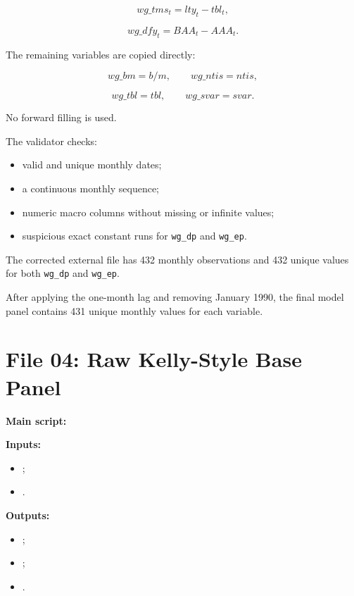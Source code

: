 \documentclass[11pt,a4paper]{article}
\newcommand{\code}[1]{\texttt{#1}}
\begin{document}
\[
  wg\_tms_t
  =
  lty_t-tbl_t,
\]

\[
  wg\_dfy_t
  =
  BAA_t-AAA_t.
\]

The remaining variables are copied directly:

\[
  wg\_bm=b/m,
  \qquad
  wg\_ntis=ntis,
\]

\[
  wg\_tbl=tbl,
  \qquad
  wg\_svar=svar.
\]

No forward filling is used.

The validator checks:

\begin{itemize}
  \item valid and unique monthly dates;
  \item a continuous monthly sequence;
  \item numeric macro columns without missing or infinite values;
  \item suspicious exact constant runs for \code{wg\_dp} and \code{wg\_ep}.
\end{itemize}

The corrected external file has 432 monthly observations and 432 unique values
for both \code{wg\_dp} and \code{wg\_ep}.

After applying the one-month lag and removing January 1990, the final model
panel contains 431 unique monthly values for each variable.


\section{File 04: Raw Kelly-Style Base Panel}

\textbf{Main script:}

\begin{center}
\end{center}

\textbf{Inputs:}

\begin{itemize}
  \item {};
  \item {}.
\end{itemize}

\textbf{Outputs:}

\begin{itemize}
  \item {};
  \item {};
  \item {}.
\end{itemize}
\end{document}
